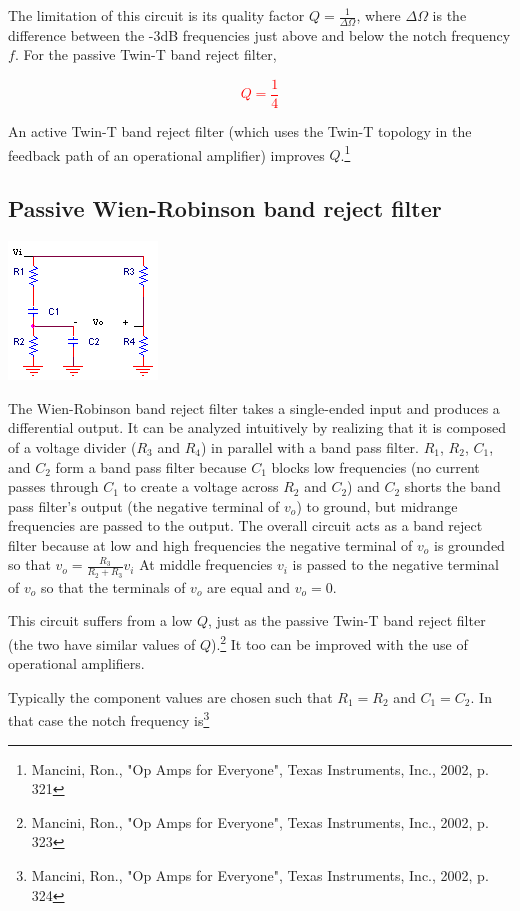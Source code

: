 The limitation of this circuit is its quality factor $Q = \frac{1}{\Delta\Omega}$, where $\Delta\Omega$ is the difference between the -3dB frequencies just above and below the notch frequency $f$. For the passive Twin-T band reject filter,

\textcolor{red}{
\begin{equation}
Q = \frac{1}{4}
\label{passiveTwinT_Q}
\end{equation}
}

An active Twin-T band reject filter (which uses the Twin-T topology in the feedback path of an operational amplifier) improves $Q$.\footnote{Mancini, Ron., "Op Amps for Everyone", Texas Instruments, Inc., 2002, p. 321}

\subsection{Passive Wien-Robinson band reject filter}
\begin{center}
	\includegraphics{schematics/passiveWien-Robinsonbandrejectfilter.PNG}
\end{center}
The Wien-Robinson band reject filter takes a single-ended input and produces a differential output. It can be analyzed intuitively by realizing that it is composed of a voltage divider ($R_{3}$ and $R_{4}$) in parallel with a band pass filter. $R_{1}$, $R_{2}$, $C_{1}$, and $C_{2}$ form a band pass filter because $C_{1}$ blocks low frequencies (no current passes through $C_{1}$ to create a voltage across $R_{2}$ and $C_{2}$) and $C_{2}$ shorts the band pass filter's output (the negative terminal of $v_{o}$) to ground, but midrange frequencies are passed to the output. The overall circuit acts as a band reject filter because at low and high frequencies the negative terminal of $v_{o}$ is grounded so that $v_{o} = \frac{R_{3}}{R_{2}+R_{3}}v_{i}$
At middle frequencies $v_{i}$ is passed to the negative terminal of $v_{o}$ so that the terminals of $v_{o}$ are equal and $v_{o} = 0$.
\par This circuit suffers from a low $Q$, just as the passive Twin-T band reject filter (the two have similar values of $Q$).\footnote{Mancini, Ron., "Op Amps for Everyone", Texas Instruments, Inc., 2002, p. 323} It too can be improved with the use of operational amplifiers.
\par Typically the component values are chosen such that $R_{1} = R_{2}$ and $C_{1} = C_{2}$. In that case the notch frequency is\footnote{Mancini, Ron., "Op Amps for Everyone", Texas Instruments, Inc., 2002, p. 324}

